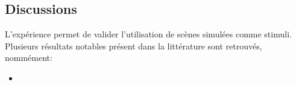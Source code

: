 

\subsection{Discussions}

L'expérience permet de valider l'utilisation de scènes simulées comme stimuli. Plusieurs résultats notables présent dans la littérature sont retrouvés, nommément:

\begin{itemize}
\item {}
\end{itemize}

